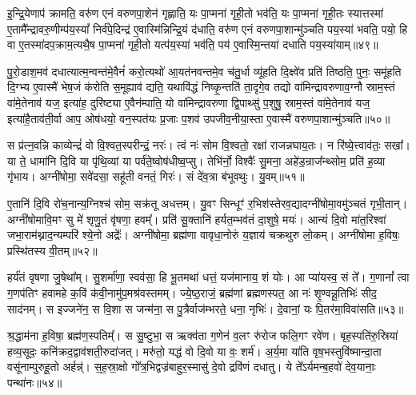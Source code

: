 इ॒न्द्रि॒येणाप॑ क्रामति॒ वरु॑ण एनं वरुणपा॒शेन॑ गृह्णाति॒ यः पा॒प्मना॑ गृही॒तो भव॑ति॒ यः पा॒प्मना॑ गृही॒तः स्यात्तस्मा॑ ए॒तामै᳚न्द्रावरु॒णीम्प॑य॒स्यां᳚ निर्व॑पे॒दिन्द्र॑ ए॒वास्मि॑न्निन्द्रि॒यं द॑धाति॒ वरु॑ण एनं वरुणपा॒शान्मु॑ञ्चति पय॒स्या॑ भवति॒ पयो॒ हि वा ए॒तस्मा॑दप॒क्राम॒त्यथै॒ष पा॒प्मना॑ गृही॒तो यत्प॑य॒स्या॑ भव॑ति॒ पय॑ ए॒वास्मि॒न्तया॑ दधाति पय॒स्या॑याम्॥४९॥

पु॒रो॒डाश॒मव॑ दधात्यात्म॒न्वन्त॑मे॒वैनं॑ करो॒त्यथो॑ आ॒यत॑नवन्तमे॒व च॑तु॒र्धा व्यू॑हति दि॒क्ष्वे॑व प्रति॑ तिष्ठति॒ पुनः॒ समू॑हति दि॒ग्भ्य ए॒वास्मै॑ भेष॒जं क॑रोति स॒मूह्याव॑ द्यति॒ यथावि॑द्धं निष्कृ॒न्तति॑ ता॒दृगे॒व तद्यो वा॑मिन्द्रावरुणाव॒ग्नौ स्राम॒स्तं वा॑मे॒तेनाव॑ यज॒ इत्या॑ह॒ दुरि॑ष्ट्या ए॒वैन॑म्पाति॒ यो वा॑मिन्द्रावरुणा द्वि॒पाथ्सु॑ प॒शुषु॒ स्राम॒स्तं वा॑मे॒तेनाव॑ यज॒ इत्या॑है॒ताव॑ती॒र्वा आप॒ ओष॑धयो॒ वन॒स्पत॑यः प्र॒जाः प॒शव॑ उपजीव॒नीया॒स्ता ए॒वास्मै॑ वरुणपा॒शान्मु॑ञ्चति॥५०॥

{\anuvakamend[{ए॒तस्य॑ पय॒स्या॑याम्पाति॒ षड्विꣳ॑शतिश्च॥13॥}]}

स प्र॑त्न॒वन्नि काव्येन्द्रं॑ वो वि॒श्वत॒स्परीन्द्रं॒ नरः॑। त्वं नः॑ सोम वि॒श्वतो॒ रक्षा॑ राजन्नघाय॒तः। न रि॑ष्ये॒त्त्वाव॑तः॒ सखा᳚। या ते॒ धामा॑नि दि॒वि या पृ॑थि॒व्यां या पर्व॑ते॒ष्वोष॑धीष्व॒प्सु। तेभि॑र्नो॒ विश्वैः᳚ सु॒मना॒ अहे॑ड॒न्राज᳚न्थ्सोम॒ प्रति॑ ह॒व्या गृ॑भाय। अग्नी॑षोमा॒ सवे॑दसा॒ सहू॑ती वनतं॒ गिरः॑। सं दे॑व॒त्रा ब॑भूवथुः। यु॒वम्॥५१॥

ए॒तानि॑ दि॒वि रो॑च॒नान्य॒ग्निश्च॑ सोम॒ सक्र॑तू अधत्तम्। यु॒वꣳ सिन्धूꣳ॑ र॒भिश॑स्तेरव॒द्यादग्नी॑षोमा॒वमु॑ञ्चतं गृभी॒तान्। अग्नी॑षोमावि॒मꣳ सु मे॑ शृणु॒तं वृ॑षणा॒ हवम्᳚। प्रति॑ सू॒क्तानि॑ हर्यत॒म्भव॑तं दा॒शुषे॒ मयः॑। आन्यं दि॒वो मा॑त॒रिश्वा॑ जभा॒राम॑थ्नाद॒न्यम्परि॑ श्ये॒नो अद्रेः᳚। अग्नी॑षोमा॒ ब्रह्म॑णा वावृधा॒नोरुं य॒ज्ञाय॑ चक्रथुरु लो॒कम्। अग्नी॑षोमा ह॒विषः॒ प्रस्थि॑तस्य वी॒तम्॥५२॥

हर्य॑तं वृषणा जु॒षेथा᳚म्। सु॒शर्मा॑णा॒ स्वव॑सा॒ हि भू॒तमथा॑ धत्तं॒ यज॑मानाय॒ शं योः। आ प्या॑यस्व॒ सं ते᳚। ग॒णानां᳚ त्वा ग॒णप॑तिꣳ हवामहे क॒विं क॑वी॒नामु॑प॒मश्र॑वस्तमम्। ज्ये॒ष्ठ॒राजं॒ ब्रह्म॑णां ब्रह्मणस्पत॒ आ नः॑ शृ॒ण्वन्नू॒तिभिः॑ सीद॒ साद॑नम्। स इज्जने॑न॒ स वि॒शा स जन्म॑ना॒ स पु॒त्रैर्वाज॑म्भरते॒ धना॒ नृभिः॑। दे॒वानां॒ यः पि॒तर॑मा॒विवा॑सति॥५३॥

श्र॒द्धाम॑ना ह॒विषा॒ ब्रह्म॑ण॒स्पतिम्᳚। स सु॒ष्टुभा॒ स ऋक्व॑ता ग॒णेन॑ व॒लꣳ रु॑रोज फलि॒गꣳ रवे॑ण। बृह॒स्पति॑रु॒स्रिया॑ हव्य॒सूदः॒ कनि॑क्रद॒द्वाव॑शती॒रुदा॑जत्। मरु॑तो॒ यद्ध॑ वो दि॒वो या वः॒ शर्म॑। अ॒र्य॒मा या॑ति वृष॒भस्तुवि॑ष्मान्दा॒ता वसू॑नाम्पुरुहू॒तो अर्\mbox{}हन्न्॑। स॒ह॒स्रा॒क्षो गो᳚त्र॒भिद्वज्र॑बाहुर॒स्मासु॑ दे॒वो द्रवि॑णं दधातु। ये ते᳚\-ऽर्यमन्ब॒हवो॑ देव॒यानाः॒ पन्था॑नः॥५४॥

